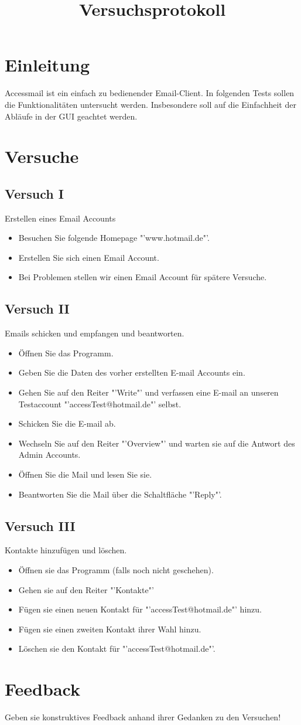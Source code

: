 \documentclass[10pt,a4paper]{article}
\title{Versuchsprotokoll}
\begin{document}
\maketitle
\section*{Einleitung}
Accessmail ist ein einfach zu bedienender Email-Client. In folgenden Tests 
sollen die Funktionalitäten untersucht werden. Insbesondere 
soll auf die Einfachheit der Abläufe in der GUI geachtet werden.
\section*{Versuche}
\subsection*{Versuch I}
Erstellen eines Email Accounts
\begin{itemize}
	\item Besuchen Sie folgende Homepage "'www.hotmail.de"'.
	\item Erstellen Sie sich einen Email Account.
	\item Bei Problemen stellen wir einen Email Account für spätere Versuche.
\end{itemize}
\subsection*{Versuch II}
Emails schicken und empfangen und beantworten.
\begin{itemize}
	\item Öffnen Sie das Programm.
	\item Geben Sie die Daten des vorher erstellten E-mail Accounts ein.
	\item Gehen Sie auf den Reiter "'Write"' und verfassen eine E-mail an unseren Testaccount "'accessTest@hotmail.de"' selbst. 
	\item Schicken Sie die E-mail ab.
	\item Wechseln Sie auf den Reiter "'Overview"' und warten sie auf die Antwort des Admin Accounts.
	\item Öffnen Sie die Mail und lesen Sie sie.
	\item Beantworten Sie die Mail über die Schaltfläche "'Reply"'.	
\end{itemize}
\subsection*{Versuch III}
Kontakte hinzufügen und löschen.
\begin{itemize}
	\item Öffnen sie das Programm (falls noch nicht geschehen).
	\item Gehen sie auf den Reiter "'Kontakte"'
	\item Fügen sie einen neuen Kontakt für "'accessTest@hotmail.de"' hinzu.
	\item Fügen sie einen zweiten Kontakt ihrer Wahl hinzu.
	\item Löschen sie den Kontakt für "'accessTest@hotmail.de"'. 	
\end{itemize}
\section*{Feedback}
Geben sie konstruktives Feedback anhand ihrer Gedanken zu den Versuchen! 
\end{document}
